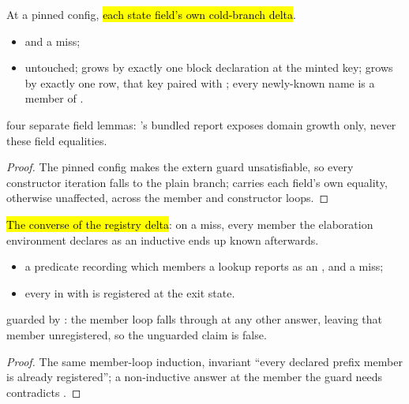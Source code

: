 \begin{lemma}
\label{lem:Erasure-run_register_inductive_cold_constants}
\leanok
{}
 At a pinned  config, \hl{each state field's own cold-branch delta}.
\begin{itemize}
\item {}  and a miss;
\item {}  untouched;  grows by exactly one block declaration
at the minted key;  grows by exactly one row, that key paired with
; every newly-known  name is a member of .
\end{itemize}
 four separate field lemmas: 's bundled report exposes domain growth
only, never these field equalities.
\end{lemma}
\begin{proof}
\leanok
{}
 The pinned config makes the extern guard unsatisfiable, so every constructor iteration
falls to the plain branch;  carries each field's own equality, otherwise
unaffected, across the member and constructor loops.
\end{proof}

\begin{theorem}
\label{thm:Erasure-run_register_inductive_members}
\leanok
{}
 \hl{The converse of the registry delta}: on a miss, every member the elaboration
environment declares as an inductive ends up known afterwards.
\begin{itemize}
\item {} a predicate  recording which members a lookup  reports as an
, and a miss;
\item {} every  in  with  is registered at the exit
state.
\end{itemize}
 guarded by : the member loop falls through  at any other
answer, leaving that member unregistered, so the unguarded claim is false.
\end{theorem}
\begin{proof}
\leanok
{}
 The same member-loop induction, invariant ``every declared prefix member is already
registered''; a non-inductive answer at the member the guard needs contradicts .
\end{proof}

